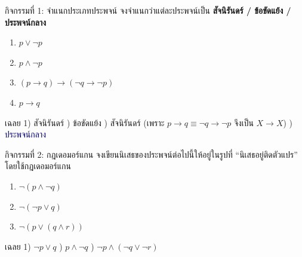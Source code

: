 \begin{frame}{กิจกรรมที่ 1: จำแนกประเภทประพจน์ }
  จงจำแนกว่าแต่ละประพจน์เป็น \textbf{สัจนิรันดร์ / ข้อขัดแย้ง / ประพจน์กลาง}
  \begin{enumerate}
    \item $p \lor \neg p$
    \item $p \land \neg p$
    \item $(p \rightarrow q) \rightarrow (\neg q \rightarrow \neg p)$
    \item $p \rightarrow q$
  \end{enumerate}
  \pause
  \begin{exampleblock}{เฉลย}
    \footnotesize
    1) \textcolor{Tgreen}{สัจนิรันดร์} ) \textcolor{Fred}{ข้อขัดแย้ง} ) \textcolor{Tgreen}{สัจนิรันดร์} (เพราะ $p\rightarrow q \equiv \neg q\rightarrow\neg p$ จึงเป็น $X\rightarrow X$) ) \textcolor{navy}{ประพจน์กลาง}
  \end{exampleblock}
\end{frame}

\begin{frame}{กิจกรรมที่ 2: กฎเดอมอร์แกน }
  จงเขียนนิเสธของประพจน์ต่อไปนี้ให้อยู่ในรูปที่ ``นิเสธอยู่ติดตัวแปร'' โดยใช้กฎเดอมอร์แกน
  \begin{enumerate}
    \item $\neg(p \land \neg q)$
    \item $\neg(\neg p \lor q)$
    \item $\neg(p \lor (q \land r))$
  \end{enumerate}
  \pause
  \begin{exampleblock}{เฉลย}
    \footnotesize
    1) $\neg p \lor q$ ) $p \land \neg q$ ) $\neg p \land (\neg q \lor \neg r)$
  \end{exampleblock}
\end{frame}

